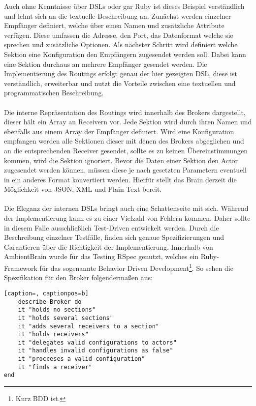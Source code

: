 Auch ohne Kenntnisse über DSLs oder gar Ruby ist dieses Beispiel verständlich und lehnt sich an die textuelle Beschreibung an. Zunächst werden einzelner Empfänger definiert, welche über einen Namen und zusätzliche Attribute verfügen. Diese umfassen die Adresse, den Port, das Datenformat welche sie sprechen und zusätzliche Optionen. Als nächster Schritt wird definiert welche Sektion eine Konfiguration den Empfängern zugesendet werden soll. Dabei kann eine Sektion durchaus an mehrere Empfänger gesendet werden. Die Implementierung des Routings erfolgt genau der hier gezeigten DSL, diese ist verständlich, erweiterbar und nutzt die Vorteile zwischen eine textuellen und programmatischen Beschreibung. 
\\\\
Die interne Repräsentation des Routings wird innerhalb des Brokers dargestellt, dieser hält ein Array an Receivern vor. Jede Sektion wird durch ihren Namen und ebenfalls aus einem Array der Empfänger definiert. Wird eine Konfiguration empfangen werden alle Sektionen dieser mit denen des Brokers abgeglichen und an die entsprechenden Receiver gesendet, sollte es zu keinen Übereinstimmungen kommen, wird die Sektion ignoriert. Bevor die Daten einer Sektion den Actor zugesendet werden können, müssen diese je nach gesetzten Parametern eventuell in ein anderes Format konvertiert werden. Hierfür stellt das Brain derzeit die Möglichkeit von JSON, XML und Plain Text bereit. 
\\\\
Die Eleganz der internen DSLs bringt auch eine Schattenseite mit sich. Während der Implementierung kann es zu einer Vielzahl von Fehlern kommen. Daher sollte in diesem Falle ausschließlich Test-Driven entwickelt werden. Durch die Beschreibung einzelner Testfälle, finden sich genaue Spezifizierungen und Garantieren über die Richtigkeit der Implementierung. Innerhalb von AmbientBrain wurde für das Testing RSpec genutzt, welches ein Ruby-Framework für das sogenannte Behavior Driven Development\footnote{Kurz BDD ist.}. So sehen die Spezifikation für den Broker folgendermaßen aus: 


\begin{lstlisting}[caption=, captionpos=b]
	describe Broker do
	it "holds no sections"
	it "holds several sections"
	it "adds several receivers to a section" 
	it "holds receivers" 
	it "delegates valid configurations to actors" 
	it "handles invalid configurations as false" 
	it "procceses a valid configuration" 
	it "finds a receiver" 
end

\end{lstlisting}

